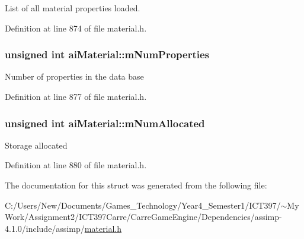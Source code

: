 List of all material properties loaded. 

Definition at line 874 of file material.h.\hypertarget{structai_material_243b07afdc6507f8878c93a2cafe4963}{
\subsubsection[mNumProperties]{\setlength{\rightskip}{0pt plus 5cm}unsigned int {\bf aiMaterial::mNumProperties}}}
\label{structai_material_243b07afdc6507f8878c93a2cafe4963}


Number of properties in the data base 

Definition at line 877 of file material.h.\hypertarget{structai_material_84a0016a263362c52b27a9d8d76dc449}{
\subsubsection[mNumAllocated]{\setlength{\rightskip}{0pt plus 5cm}unsigned int {\bf aiMaterial::mNumAllocated}}}
\label{structai_material_84a0016a263362c52b27a9d8d76dc449}


Storage allocated 

Definition at line 880 of file material.h.

The documentation for this struct was generated from the following file:\begin{CompactItemize}
\item 
C:/Users/New/Documents/Games\_\-Technology/Year4\_\-Semester1/ICT397/$\sim$My Work/Assignment2/ICT397Carre/CarreGameEngine/Dependencies/assimp-4.1.0/include/assimp/\hyperlink{material_8h}{material.h}\end{CompactItemize}
